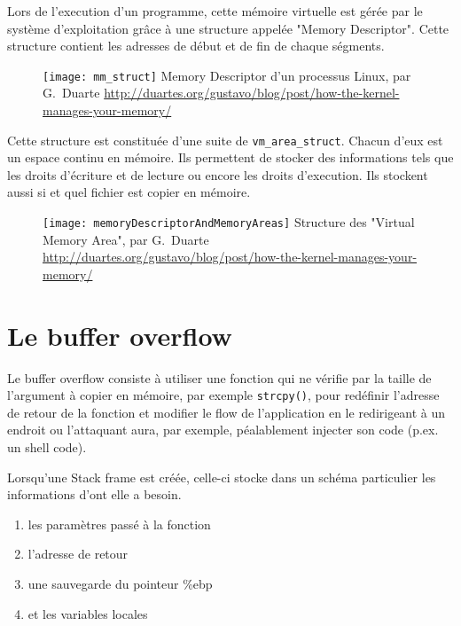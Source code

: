 Lors de l'execution d'un programme, cette mémoire virtuelle est gérée par le système d'exploitation grâce à une structure appelée "Memory Descriptor". Cette structure contient les adresses de début et de fin de chaque ségments.

\begin{figure}[H]
	\centering
	\texttt{[image: mm\_struct]}
	{Memory Descriptor d'un processus Linux, par G.~Duarte}
	{\url{http://duartes.org/gustavo/blog/post/how-the-kernel-manages-your-memory/}}
	\label{fig:mm_struct}
\end{figure}

Cette structure est constituée d'une suite de \texttt{vm_area_struct}. Chacun d'eux est un espace continu en mémoire. Ils permettent de stocker des informations tels que les droits d'écriture et de lecture ou encore les droits d'execution. Ils stockent aussi si et quel fichier est copier en mémoire.

\begin{figure}[H]
	\centering
	\texttt{[image: memoryDescriptorAndMemoryAreas]}
	{Structure des "Virtual Memory Area", par G.~Duarte}
	{\url{http://duartes.org/gustavo/blog/post/how-the-kernel-manages-your-memory/}}
	\label{fig:memoryDescriptorAndMemoryAreas}
\end{figure}

\section{Le buffer overflow}

Le buffer overflow consiste à utiliser une fonction qui ne vérifie par la taille de l'argument à copier en mémoire, par exemple \texttt{strcpy()}, pour redéfinir l'adresse de retour de la fonction et modifier le flow de l'application en le redirigeant à un endroit ou l'attaquant aura, par exemple, péalablement injecter son code (p.ex. un shell code).

Lorsqu'une Stack frame est créée, celle-ci stocke dans un schéma particulier les informations d'ont elle a besoin.

\begin{enumerate}
	\item les paramètres passé à la fonction
	\item l'adresse de retour
	\item une sauvegarde du pointeur \%ebp
	\item et les variables locales
\end{enumerate}

